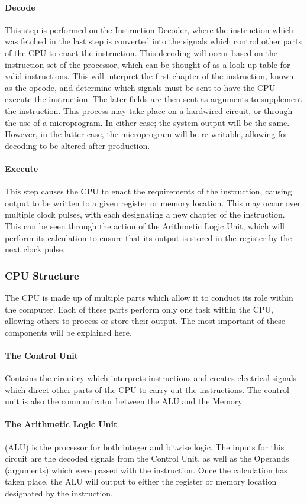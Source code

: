 				\paragraph{Decode}
					This step is performed on the Instruction Decoder, where the instruction which was fetched in the last step is converted into the signals which control other parts of the CPU to enact the instruction.
					This decoding will occur based on the instruction set of the processor, which can be thought of as a look-up-table for valid instructions.
					This will interpret the first chapter of the instruction, known as the opcode, and determine which signals must be sent to have the CPU execute the instruction.
					The later fields are then sent as arguments to supplement the instruction.
					This process may take place on a hardwired circuit, or through the use of a microprogram.
					In either case; the system output will be the same.
					However, in the latter case, the microprogram will be re-writable, allowing for decoding to be altered after production.
				\paragraph{Execute}
					This step causes the CPU to enact the requirements of the instruction, causing output to be written to a given register or memory location.
					This may occur over multiple clock pulses, with each designating a new chapter of the instruction.
					This can be seen through the action of the Arithmetic Logic Unit, which will perform its calculation to ensure that its output is stored in the register by the next clock pulse.
			\subsubsection{CPU Structure}
				The CPU is made up of multiple parts which allow it to conduct its role within the computer.
				Each of these parts perform only one task within the CPU, allowing others to process or store their output.
				The most important of these components will be explained here.
				\paragraph{The Control Unit}
					Contains the circuitry which interprets instructions and creates electrical signals which direct other parts of the CPU to carry out the instructions.
					The control unit is also the communicator between the ALU and the Memory.
				\paragraph{The Arithmetic Logic Unit}
					(ALU) is the processor for both integer and bitwise logic.
					The inputs for this circuit are the decoded signals from the Control Unit, as well as the Operands (arguments) which were passed with the instruction.
					Once the calculation has taken place, the ALU will output to either the register or memory location designated by the instruction.
